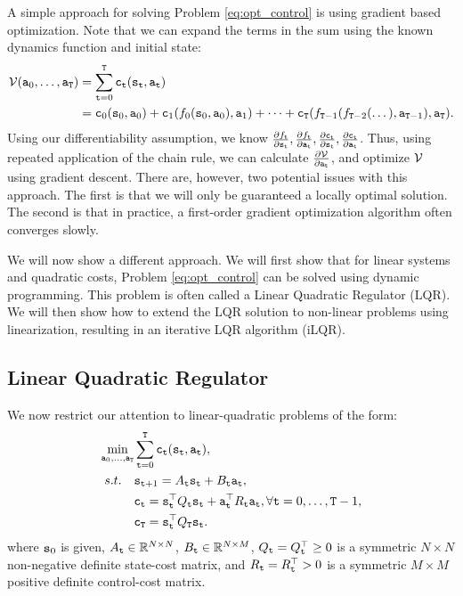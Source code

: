 A simple approach for solving Problem \ref{eq:opt_control} is using gradient based optimization. Note that we can expand the terms in the sum using the known dynamics function and initial state:
\begin{equation*}
\begin{split}
        \mathcal{V}({\tt a}_0,\dots,{\tt a}_{\tt T}) &= \sum_{{\tt t}=0}^{\tt T} {\tt c}_{\tt t}({\tt s}_{\tt t}, {\tt a}_{\tt t}) \\
        & = {\tt c}_0({\tt s}_0, {\tt a}_0) + {\tt c}_1(f_0({\tt s}_0,{\tt a}_0), {\tt a}_1) + \dots + {\tt c}_{\tt T}(f_{{\tt T} - 1}(f_{{\tt T} - 2}(\dots ),{\tt a}_{{\tt T}-1}), {\tt a}_{\tt T}).
\end{split}
\end{equation*}
Using our differentiability assumption, we know $\frac{\partial f_{\tt t}}{\partial {\tt s}_{\tt t}}, \frac{\partial f_{\tt t}}{\partial {\tt a}_{\tt t}}, \frac{\partial {\tt c}_{\tt t}}{\partial {\tt s}_{\tt t}}, \frac{\partial {\tt c}_{\tt t}}{\partial {\tt a}_{\tt t}}$. Thus, using repeated application of the chain rule, we can calculate $\frac{\partial \mathcal{V}}{\partial {\tt a}_{\tt t}}$, and optimize $\mathcal{V}$ using gradient descent. There are, however, two potential issues with this approach. The first is that we will only be guaranteed a locally optimal solution. The second is that in practice, a first-order gradient optimization algorithm often converges slowly.

We will now show a different approach. We will first show that for linear systems and quadratic costs, Problem \ref{eq:opt_control} can be solved using dynamic programming. This problem is often called a Linear Quadratic Regulator (LQR). We will then show how to extend the LQR solution to non-linear problems using linearization, resulting in an iterative LQR algorithm (iLQR).

\subsection{Linear Quadratic Regulator}

We now restrict our attention to linear-quadratic problems of the form:
\begin{equation}\label{eq:lqr}
    \begin{split}
        \min_{{\tt a}_0,\dots,{\tt a}_{{\tt T}}} & \sum_{{\tt t}=0}^{\tt T} {\tt c}_{\tt t}({\tt s}_{\tt t}, {\tt a}_{\tt t}), \\
        s.t. \quad & {{\tt s}_{{\tt t}+1}} = A_{\tt t} {\tt s}_{\tt t} + B_{\tt t} {\tt a}_{\tt t}, \\
        & {\tt c}_{\tt t} = {\tt s}_{\tt t}^\top Q_{\tt t} {\tt s}_{\tt t} + {\tt a}_{\tt t}^\top R_{\tt t} {\tt a}_{\tt t}, \forall {\tt t}=0,\dots,{\tt T}-1, \\
        & {\tt c}_{\tt T} = {\tt s}_{\tt t}^\top Q_{\tt T} {\tt s}_{\tt t}.
    \end{split}
\end{equation}
where ${\tt s}_0$ is given, $A_{\tt t} \in \mathbb{R}^{N \times N}$, $B_{\tt t}\in \mathbb{R}^{N \times M}$, $Q_{\tt t}=Q_{\tt t}^\top \geq 0$ is a symmetric $N \times N$ non-negative definite state-cost matrix, and $R_{\tt t} = R_{\tt t}^\top > 0 $ is a symmetric $M \times M$ positive definite control-cost matrix.

